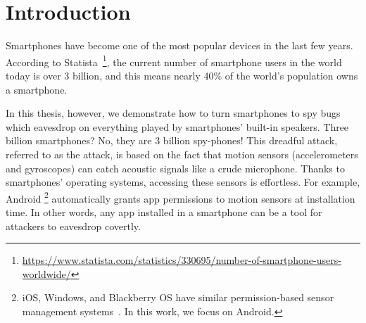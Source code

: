 \section{Introduction}\label{sec:intro}

Smartphones have become one of the most popular devices in the last few years. According to Statista~\footnote{\url{https://www.statista.com/statistics/330695/number-of-smartphone-users-worldwide/}}, the current number of smartphone users in the world today is over 3 billion, and this means nearly 40\% of the world’s population owns a smartphone. 

In this thesis, however, we demonstrate how to turn smartphones to spy bugs which eavesdrop on everything played by smartphones' built-in speakers. Three billion smartphones? No, they are 3 billion spy-phones!
%
This dreadful attack, referred to as the \textit{{\attackName}} attack, is based on the fact that motion sensors (accelerometers and gyroscopes) can catch acoustic signals like a crude microphone. 
%
Thanks to smartphones' operating systems, accessing these sensors is effortless. 
For example,  Android
\footnote{\scriptsize iOS, Windows, and Blackberry OS have similar permission-based sensor management systems~\cite{sikder20176thsense}. In this work, we focus on Android.} 
automatically grants app permissions to motion sensors at installation time. In other words, any app installed in a smartphone can be a tool for attackers to eavesdrop covertly.

